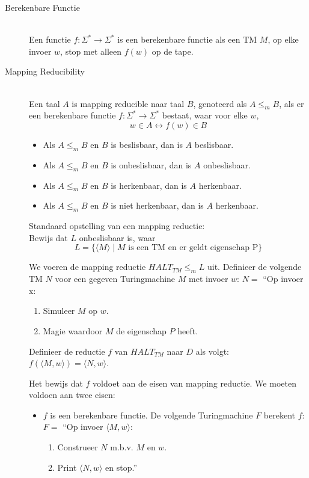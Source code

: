 \documentclass[]{article}
\begin{document}
\begin{itemize}
\begin{description}
	\item[Berekenbare Functie] \hfill \\
	Een functie $f: \Sigma^* \rightarrow \Sigma^*$ is een berekenbare functie als een TM $M$, op elke invoer $w$, stop met alleen $f(w)$ op de tape.
	
	\item[Mapping Reducibility] \hfill \\
	Een taal $A$ is mapping reducible naar taal $B$, genoteerd als $A \leq_m B$, als er een berekenbare functie $f: \Sigma^* \rightarrow \Sigma^*$ bestaat, waar voor elke $w$,
	$$w \in A \longleftrightarrow f(w) \in B$$
	\begin{itemize}
		\item Als $A \leq_m B$ en $B$ is beslisbaar, dan is $A$ beslisbaar.
		\item Als $A \leq_m B$ en $B$ is onbeslisbaar, dan is $A$ onbeslisbaar.
		\item Als $A \leq_m B$ en $B$ is herkenbaar, dan is $A$ herkenbaar.
		\item Als $A \leq_m B$ en $B$ is niet herkenbaar, dan is $A$ herkenbaar.
	\end{itemize}
	
	Standaard opstelling van een mapping reductie:\\
	Bewijs dat $L$ onbeslisbaar is, waar
	$$L = \{ \langle M \rangle \mid M \mbox{ is een TM en er geldt eigenschap P}\}$$ 

	We voeren de mapping reductie $HALT_{TM} \leq_m L$ uit.
	Definieer de volgende TM $N$ voor een gegeven Turingmachine $M$ met invoer $w$:
	$N = $ ``Op invoer x:
	\begin{enumerate}
		\item Simuleer $M$ op $w$.
		\item Magie waardoor $M$ de eigenschap $P$ heeft.
	\end{enumerate}
	Definieer de reductie $f$ van $HALT_{TM}$ naar $D$ als volgt: $f( \langle M, w \rangle ) = \langle N, w \rangle$.
	
	Het bewijs dat $f$ voldoet aan de eisen van mapping reductie. We moeten voldoen aan twee eisen:
	\begin{itemize}
		\item $f$ is een berekenbare functie. De volgende Turingmachine $F$ berekent $f$: \\
		$F = $ ``Op invoer $\langle M, w \rangle$:
		\begin{enumerate}
			\item Construeer $N$ m.b.v. $M$ en $w$.
			\item Print $\langle N, w \rangle$ en stop.''
		\end{enumerate}
		

\end{itemize}
\end{description}
\end{itemize}
\end{document}
